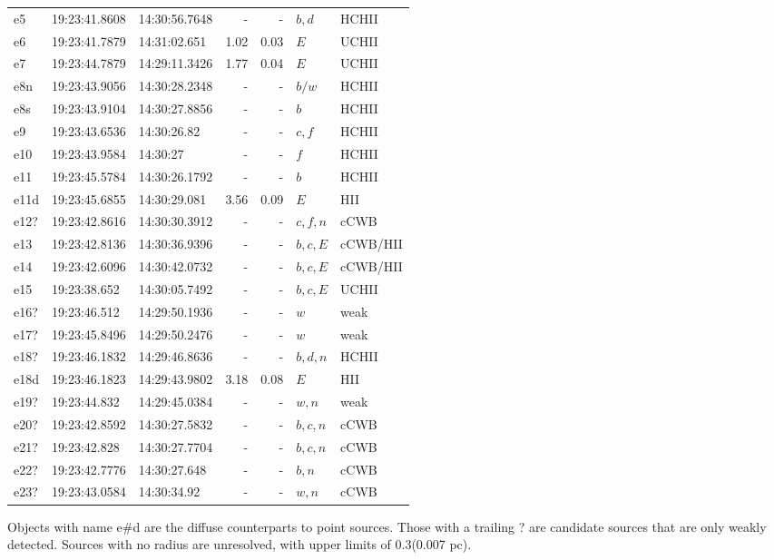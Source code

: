 \begin{table*}[htp]
\begin{tabular}{lllrrll}
e5 & 19:23:41.8608 & 14:30:56.7648 & - & - & $b,d$ & HCHII \\
e6 & 19:23:41.7879 & 14:31:02.651 & 1.02 & 0.03 & $E$ & UCHII \\
e7 & 19:23:44.7879 & 14:29:11.3426 & 1.77 & 0.04 & $E$ & UCHII \\
e8n & 19:23:43.9056 & 14:30:28.2348 & - & - & $b/w$ & HCHII \\
e8s & 19:23:43.9104 & 14:30:27.8856 & - & - & $b$ & HCHII \\
e9 & 19:23:43.6536 & 14:30:26.82 & - & - & $c,f$ & HCHII \\
e10 & 19:23:43.9584 & 14:30:27 & - & - & $f$ & HCHII \\
e11 & 19:23:45.5784 & 14:30:26.1792 & - & - & $b$ & HCHII \\
e11d & 19:23:45.6855 & 14:30:29.081 & 3.56 & 0.09 & $E$ & HII \\
e12? & 19:23:42.8616 & 14:30:30.3912 & - & - & $c,f,n$ & cCWB \\
e13 & 19:23:42.8136 & 14:30:36.9396 & - & - & $b,c,E$ & cCWB/HII \\
e14 & 19:23:42.6096 & 14:30:42.0732 & - & - & $b,c,E$ & cCWB/HII \\
e15 & 19:23:38.652 & 14:30:05.7492 & - & - & $b,c,E$ & UCHII \\
e16? & 19:23:46.512 & 14:29:50.1936 & - & - & $w$ & weak \\
e17? & 19:23:45.8496 & 14:29:50.2476 & - & - & $w$ & weak \\
e18? & 19:23:46.1832 & 14:29:46.8636 & - & - & $b,d,n$ & HCHII \\
e18d & 19:23:46.1823 & 14:29:43.9802 & 3.18 & 0.08 & $E$ & HII \\
e19? & 19:23:44.832 & 14:29:45.0384 & - & - & $w,n$ & weak \\
e20? & 19:23:42.8592 & 14:30:27.5832 & - & - & $b,c,n$ & cCWB \\
e21? & 19:23:42.828 & 14:30:27.7704 & - & - & $b,c,n$ & cCWB \\
e22? & 19:23:42.7776 & 14:30:27.648 & - & - & $b,n$ & cCWB \\
e23? & 19:23:43.0584 & 14:30:34.92 & - & - & $w,n$ & cCWB \\
\hline
\end{tabular}
\par
Objects with name e\#d are the diffuse counterparts to point sources.  Those with a trailing ? are candidate sources that are only weakly detected.   Sources with no radius are unresolved, with upper limits of 0.3\arcsec (0.007 pc).\\

\end{table*}

